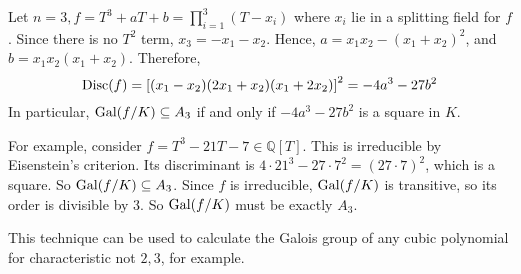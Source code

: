 \begin{example}
	Let \( n = 3, f = T^3 + aT + b = \prod_{i=1}^3 (T - x_i) \) where \( x_i \) lie in a splitting field for \( f \).
	Since there is no \( T^2 \) term, \( x_3 = -x_1 - x_2 \).
	Hence, \( a = x_1 x_2 - (x_1 + x_2)^2 \), and \( b = x_1x_2(x_1 + x_2) \).
	Therefore,
	\[ \mathrm{Disc}(f) = \qty[(x_1-x_2)(2x_1+x_2)(x_1+2x_2)]^2 = -4a^3 - 27b^2 \]
	In particular, \( \operatorname{Gal}(f/K) \subseteq A_3 \) if and only if \( -4a^3 - 27b^2 \) is a square in \( K \).

	For example, consider \( f = T^3 - 21T - 7 \in \mathbb Q[T] \).
	This is irreducible by Eisenstein's criterion.
	Its discriminant is \( 4 \cdot 21^3 - 27 \cdot 7^2 = (27 \cdot 7)^2 \), which is a square.
	So \( \operatorname{Gal}(f/K) \subseteq A_3 \).
	Since \( f \) is irreducible, \( \operatorname{Gal}(f/K) \) is transitive, so its order is divisible by 3.
	So \( \operatorname{Gal}(f/K) \) must be exactly \( A_3 \).
\end{example}
\begin{remark}
	This technique can be used to calculate the Galois group of any cubic polynomial for characteristic not \( 2, 3 \), for example.
\end{remark}
